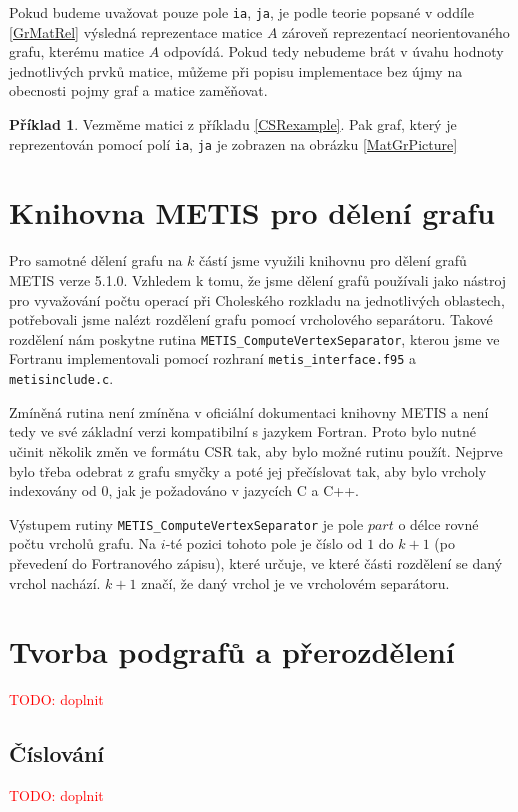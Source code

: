 \documentclass[11pt,american,czech,oneside]{book}
\theoremstyle{plain}
\theoremstyle{definition}
\newtheorem{example}{Příklad}
\newcommand{\TODO}[1]{\textcolor{red}{TODO: #1}}
\begin{document}
Pokud budeme uvažovat pouze pole \texttt{ia}, \texttt{ja}, je podle teorie popsané v oddíle \ref{GrMatRel} výsledná reprezentace matice $A$ zároveň reprezentací neorientovaného grafu, kterému matice $A$ odpovídá. Pokud tedy nebudeme brát v úvahu hodnoty jednotlivých prvků matice, můžeme při popisu implementace bez újmy na obecnosti pojmy graf a matice zaměňovat.

\begin{example}
  Vezměme matici z příkladu \ref{CSRexample}. Pak graf, který je reprezentován pomocí polí \texttt{ia}, \texttt{ja} je zobrazen na obrázku \ref{MatGrPicture}
\end{example}

\section{Knihovna METIS pro dělení grafu}

Pro samotné dělení grafu na $k$ částí jsme využili knihovnu pro dělení grafů METIS \cite{kary:13} verze 5.1.0. Vzhledem k tomu, že jsme dělení grafů používali jako nástroj pro vyvažování počtu operací při Choleského rozkladu na jednotlivých oblastech, potřebovali jsme nalézt rozdělení grafu pomocí vrcholového separátoru. Takové rozdělení nám poskytne rutina \texttt{METIS\_ComputeVertexSeparator}, kterou jsme ve Fortranu implementovali pomocí rozhraní \texttt{metis\_interface.f95} a \texttt{metisinclude.c}.

Zmíněná rutina není zmíněna v oficiální dokumentaci knihovny METIS a není tedy ve své základní verzi kompatibilní s jazykem Fortran. Proto bylo nutné učinit několik změn ve formátu CSR tak, aby bylo možné rutinu použít. Nejprve bylo třeba odebrat z grafu smyčky a poté jej přečíslovat tak, aby bylo vrcholy indexovány od 0, jak je požadováno v jazycích C a C++.

Výstupem rutiny \texttt{METIS\_ComputeVertexSeparator} je pole $part$ o délce rovné počtu vrcholů grafu. Na $i$-té pozici tohoto pole je číslo od $1$ do $k+1$ (po převedení do Fortranového zápisu), které určuje, ve které části rozdělení se daný vrchol nachází. $k+1$ značí, že daný vrchol je ve vrcholovém separátoru.

\section{Tvorba podgrafů a přerozdělení}
\TODO{doplnit}
\subsection{Číslování}
\TODO{doplnit}
\end{document}
